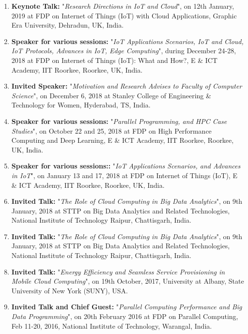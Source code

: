 \begin{enumerate} %

\item
\textbf{Keynote Talk:} "\textit{Research Directions in IoT and Cloud}", on 12th January, 2019 at FDP on Internet of Things (IoT) with Cloud Applications, Graphic Era University, Dehradun, UK, India.

\item
\textbf{Speaker for various sessions:} "\textit{IoT Applications Scenarios, IoT and Cloud, IoT Protocols, Advances in IoT, Edge Computing}", during December 24-28, 2018 at FDP on Internet of Things (IoT): What and How?, E \& ICT Academy, IIT Roorkee, Roorkee, UK, India.

\item
\textbf{Invited Speaker:} "\textit{Motivation and Research Advises to Faculty of Computer Science}", on December 6, 2018 at Stanley College of Engineering \& Technology for Women, Hyderabad, TS, India.

\item
\textbf{Speaker for various sessions:} "\textit{Parallel Programming, and HPC Case Studies}", on October 22 and 25, 2018 at FDP on High Performance Computing  and Deep Learning, E \& ICT Academy, IIT Roorkee, Roorkee, UK, India.

\item
\textbf{Speaker for various sessions::} "\textit{IoT Applications Scenarios, and Advances in IoT}", on January 13 and 17, 2018 at FDP on Internet of Things (IoT), E \& ICT Academy, IIT Roorkee, Roorkee, UK, India.

\item
\textbf{Invited Talk:} "\textit{The Role of Cloud Computing in Big Data Analytics}", on 9th January, 2018 at STTP on Big Data Analytics and Related Technologies, National Institute of Technology Raipur, Chattisgarh, India.
\item
\textbf{Invited Talk:} "\textit{The Role of Cloud Computing in Big Data Analytics}", on 9th January, 2018 at STTP on Big Data Analytics and Related Technologies, National Institute of Technology Raipur, Chattisgarh, India.
\item
\textbf{Invited Talk:} "\textit{Energy Efficiency and Seamless Service Provisioning in Mobile Cloud Computing}", on 19th October, 2017, University at Albany, State University of New York (SUNY), USA. 

\item
\textbf{Invited Talk and Chief Guest:} "\textit{Parallel Computing Performance and Big Data Programming}", on 20th February 2016 at FDP on Parallel Computing, Feb 11-20, 2016, National Institute of Technology, Warangal, India.


\end{enumerate}
